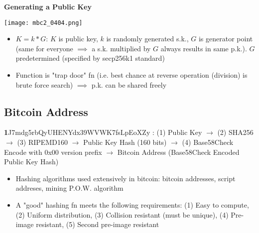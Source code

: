 \documentclass[english, 11pt]{article}
\begin{document}
\noindent \textbf{Generating a Public Key}
\begin{tcolorbox}
\begin{minipage}{0.3\linewidth}
\centering
    \texttt{[image: mbc2\_0404.png]}
\end{minipage}\hfil
\begin{minipage}{0.7\linewidth}
\begin{itemize}
    \item $K = k*G$: $K$ is public key, $k$ is randomly generated s.k., $G$ is generator point (same for everyone $\implies$ a s.k. multiplied by $G$ always results in same p.k.). $G$ predetermined (specified by secp256k1 standard)
    \item Function is "trap door" fn (i.e. best chance at reverse operation (division) is brute force search) $\implies$ p.k. can be shared freely
\end{itemize}
\end{minipage}
\end{tcolorbox}

\subsection{Bitcoin Address}
\textbf{1}J7mdg5rbQyUHENYdx39WVWK7fsLpEoXZy : (1) Public Key $\rightarrow$ (2) SHA256 $\rightarrow$ (3) RIPEMD160 $\rightarrow$ Public Key Hash (160 bits) $\rightarrow$ (4) Base58Check Encode with 0x00 version prefix $\rightarrow$ Bitcoin Address (Base58Check Encoded Public Key Hash)
\begin{itemize}
    \item Hashing algorithms used extensively in bitcoin: bitcoin addresses, script addreses, mining P.O.W. algorithm
    \item A "good" hashing fn meets the following requirements: (1) Easy to compute, (2) Uniform distribution, (3) Collision resistant (must be unique), (4) Pre-image resistant, (5) Second pre-image resistant
\end{itemize}
\end{document}
